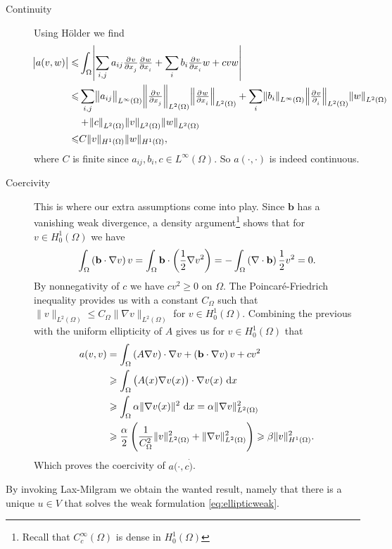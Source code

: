 \documentclass[thesis.tex]{subfiles}
\begin{document}
\begin{description}
  \item[Continuity]Using H\"older we find
    \begin{align*}
      \abs{a(v,w)} \leq &\int_\Omega \abs{\sum_{i,j} a_{ij} \pd{v}{x_j}\pd{w}{x_i}  + \sum_i b_i \pd{v}{x_i}w + cvw}\\
                   \leq &\sum_{i,j} \norm{ a_{ij}}_{L^\infty(\Omega)} \norm{ \pd{v}{x_j}}_{L^2(\Omega)} \norm{ \pd{w}{x_i}}_{L^2(\Omega)} + \sum_i \norm{b_i}_{L^\infty(\Omega)} \norm{\pd{v}{_i}}_{L^2(\Omega)} \norm{w}_{L^2(\Omega)} \\
                   &+ \norm{c}_{L^2(\Omega)} \norm{v}_{L^2(\Omega)} \norm{w}_{L^2(\Omega)} \\
                   \leq &C \|v\|_{H^1(\Omega)} \|w\|_{H^1(\Omega)},
    \end{align*}
    where $C$ is finite since $a_{ij}, b_i, c \in L^\infty(\Omega)$. So $a(\cdot,\cdot)$ is indeed continuous.
  \item[Coercivity] This is where our extra assumptions come into play. Since $\mathbf{b}$ has a vanishing weak divergence, a density argument\footnote{Recall that $C_c^\infty(\Omega)$ is dense in $H_0^1(\Omega)$} shows that for $v \in H_0^1(\Omega)$ we have
    \[
      \int_\Omega \left(\mathbf{b} \cdot \nabla v\right)v  = \int_\Omega \mathbf{b} \cdot \left({1 \over 2} \nabla v^2\right) = - \int_\Omega \left(\nabla \cdot \mathbf{b} \right) {1 \over 2} v^2 = 0.
    \]
    By nonnegativity of $c$ we have $cv^2 \geq 0$ on $\Omega$. 
     The Poincar\'e-Friedrich inequality provides us with a constant $C_\Omega$ such that $\|v\|_{L^2(\Omega)} \leq C_\Omega \|\nabla v\|_{L^2(\Omega)}$ for $v \in H_0^1(\Omega)$. Combining the previous with the uniform ellipticity of $A$ gives us for $v \in H_0^1(\Omega)$ that
    \begin{align*}
      a(v,v) &= \int_\Omega \left(A \nabla v\right) \cdot \nabla v + \left(\mathbf{b} \cdot \nabla v\right)v + cv^2 \\
             &\geq  \int_\Omega \left(A(x) \nabla v(x)\right) \cdot \nabla v(x)\, \dif x \\
             &\geq  \int_\Omega \alpha \|\nabla v(x)\|^2\, \dif x = \alpha \|\nabla v\|^2_{L^2(\Omega)}\\
             &\geq \frac{\alpha}{2} \left(\frac{1}{C^2_\Omega} \|v\|^2_{L^2(\Omega)} + \|\nabla v\|^2_{L^2(\Omega)}\right) \geq \beta \|v\|^2_{H^1(\Omega)}.
    \end{align*}
    Which proves the coercivity of $a(\cdot, c\dot)$.
\end{description}
By invoking Lax-Milgram we obtain the wanted result, namely that there is a unique $u \in V$ that solves the weak formulation \eqref{eq:ellipticweak}.
\end{document}
